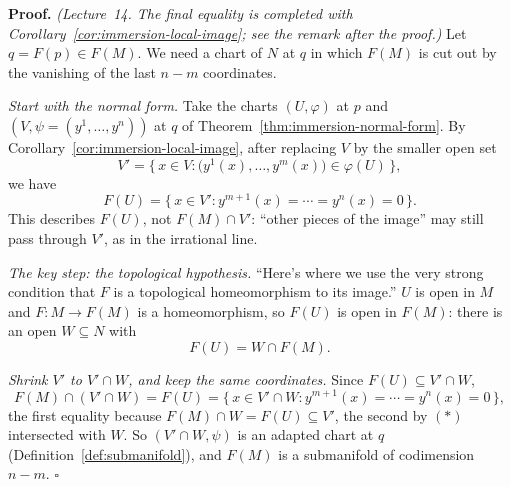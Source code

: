 \documentclass[11pt]{report}
\renewenvironment{proof}[1][Proof]{\noindent\textbf{#1.} }{\hfill$\square$\par\vspace{5pt}}
\begin{document}
\begin{proof}
\textit{(Lecture~14. The final equality is completed with Corollary~\ref{cor:immersion-local-image}; see the remark after the proof.)} Let $q = F(p) \in F(M)$. We need a chart of $N$ at $q$ in which $F(M)$ is cut out by the vanishing of the last $n - m$ coordinates.

\emph{Start with the normal form.} Take the charts $(U, \varphi)$ at $p$ and $(V, \psi = (y^1, \ldots, y^n))$ at $q$ of Theorem~\ref{thm:immersion-normal-form}. By Corollary~\ref{cor:immersion-local-image}, after replacing $V$ by the smaller open set
\[
V' = \big\{\, x \in V : \big(y^1(x), \ldots, y^m(x)\big) \in \varphi(U) \,\big\},
\]
we have
\[
F(U) = \{\, x \in V' : y^{m+1}(x) = \cdots = y^n(x) = 0 \,\}. \tag{$*$}
\]
This describes $F(U)$, not $F(M) \cap V'$: ``other pieces of the image'' may still pass through $V'$, as in the irrational line.

\emph{The key step: the topological hypothesis.} ``Here's where we use the very strong condition that $F$ is a topological homeomorphism to its image.'' $U$ is open in $M$ and $F : M \to F(M)$ is a homeomorphism, so $F(U)$ is open in $F(M)$: there is an open $W \subseteq N$ with
\[
F(U) = W \cap F(M) .
\]

\emph{Shrink $V'$ to $V' \cap W$, and keep the same coordinates.} Since $F(U) \subseteq V' \cap W$,
\[
F(M) \cap (V' \cap W) = F(U) = \{\, x \in V' \cap W : y^{m+1}(x) = \cdots = y^n(x) = 0 \,\},
\]
the first equality because $F(M) \cap W = F(U) \subseteq V'$, the second by $(*)$ intersected with $W$. So $(V' \cap W, \psi)$ is an adapted chart at $q$ (Definition~\ref{def:submanifold}), and $F(M)$ is a submanifold of codimension $n - m$.
\end{proof}
\end{document}
